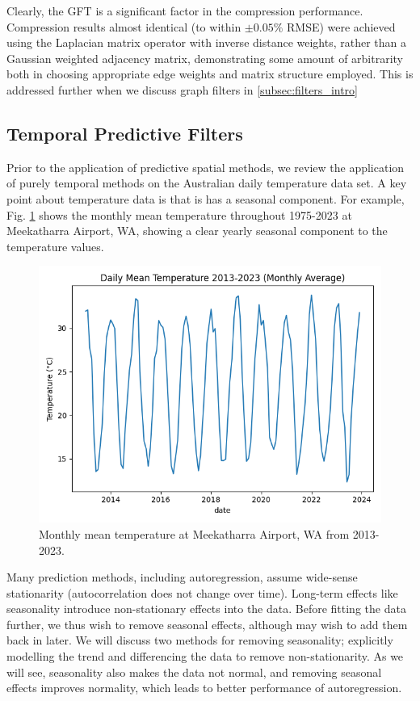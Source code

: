 \documentclass[12pt,a4paper]{article} %
\begin{document}
Clearly, the GFT is a significant factor in the compression performance. Compression results almost identical (to within $\pm0.05\%$ RMSE) were achieved using the Laplacian matrix operator with inverse distance weights, rather than a Gaussian weighted adjacency matrix, demonstrating some amount of arbitrarity both in choosing appropriate edge weights and matrix structure employed. This is addressed further when we discuss graph filters in \ref{subsec:filters_intro}

\subsection{Temporal Predictive Filters}
\label{subsec:prediction}
Prior to the application of predictive spatial methods, we review the application of purely temporal methods on the Australian daily temperature data set. A key point about temperature data is that is has a seasonal component. For example, Fig. \ref{fig:7045_monthly} shows the monthly mean temperature throughout 1975-2023 at Meekatharra Airport, WA, showing a clear yearly seasonal component to the temperature values.

\begin{figure}[!ht]
    \centering
    \includegraphics[width=0.7\linewidth]{7045_monthly.png}
    \caption{Monthly mean temperature at Meekatharra Airport, WA from 2013-2023.}
    \label{fig:7045_monthly}
\end{figure}

Many prediction methods, including autoregression, assume wide-sense stationarity (autocorrelation does not change over time). Long-term effects like seasonality introduce non-stationary effects into the data. Before fitting the data further, we thus wish to remove seasonal effects, although may wish to add them back in later. We will discuss two methods for removing seasonality; explicitly modelling the trend and differencing the data to remove non-stationarity. As we will see, seasonality also makes the data not normal, and removing seasonal effects improves normality, which leads to better performance of autoregression.
\end{document}
